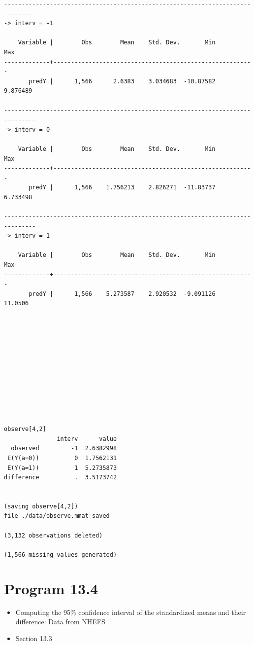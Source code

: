 \documentclass[
  10pt,
]{book}
\providecommand{\tightlist}{%
  \setlength{\itemsep}{0pt}\setlength{\parskip}{0pt}}
\begin{document}
\begin{verbatim}
-------------------------------------------------------------------------------
-> interv = -1

    Variable |        Obs        Mean    Std. Dev.       Min        Max
-------------+---------------------------------------------------------
       predY |      1,566      2.6383    3.034683  -10.87582   9.876489

-------------------------------------------------------------------------------
-> interv = 0

    Variable |        Obs        Mean    Std. Dev.       Min        Max
-------------+---------------------------------------------------------
       predY |      1,566    1.756213    2.826271  -11.83737   6.733498

-------------------------------------------------------------------------------
-> interv = 1

    Variable |        Obs        Mean    Std. Dev.       Min        Max
-------------+---------------------------------------------------------
       predY |      1,566    5.273587    2.920532  -9.091126    11.0506












observe[4,2]
               interv      value
  observed         -1  2.6382998
 E(Y(a=0))          0  1.7562131
 E(Y(a=1))          1  5.2735873
difference          .  3.5173742


(saving observe[4,2])
file ./data/observe.mmat saved

(3,132 observations deleted)

(1,566 missing values generated)
\end{verbatim}

\hypertarget{program-13.4-1}{%
\section{Program 13.4}\label{program-13.4-1}}

\begin{itemize}
\tightlist
\item
  Computing the 95\% confidence interval of the standardized means and their difference: Data from NHEFS
\item
  Section 13.3
\end{itemize}
\end{document}
